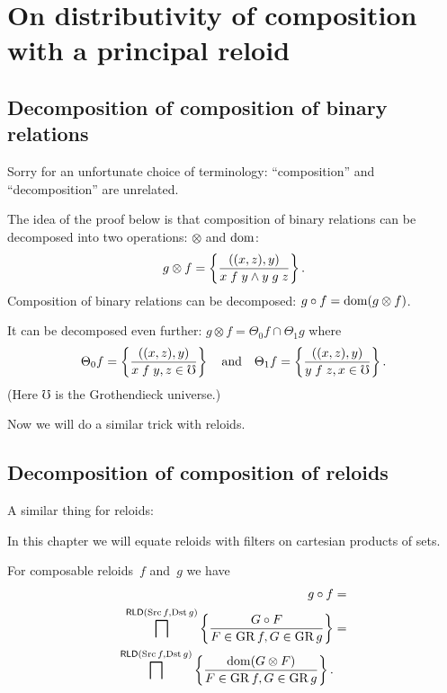 
\chapter{On distributivity of composition with a principal reloid}


\section{Decomposition of composition
of binary relations}
\begin{rem}
Sorry for an unfortunate choice of terminology: ``composition''
and ``decomposition'' are unrelated.
\end{rem}
The idea of the proof below is that composition of binary relations
can be decomposed into two operations: $\otimes$ and $\operatorname{dom}$:
\[
g\otimes f=\left\{ \frac{((x,z),y)}{x\mathrel fy\land y\mathrel gz}\right\}.
\]
Composition of binary relations can be decomposed: $g\circ f=\operatorname{dom}(g\otimes f)$.

It can be decomposed even further: $g\otimes f=\Theta_{0}f\cap\Theta_{1}g$
where
\[
\Theta_{0}f=\left\{ \frac{((x,z),y)}{x\mathrel fy,z\in\mho}\right\}\quad\text{and}\quad\Theta_{1}f=\left\{ \frac{((x,z),y)}{y\mathrel fz,x\in\mho}\right\}.
\]
(Here $\mho$ is the Grothendieck universe.)

Now we will do a similar trick with reloids.


\section{Decomposition of
composition of reloids}

A similar thing for reloids:

In this chapter we will equate reloids with filters on cartesian products
of sets.

For composable reloids~$f$ and~$g$ we have
\begin{align*}
g\circ f & =\\
\bigsqcap^{\mathsf{RLD}(\operatorname{Src} f,\operatorname{Dst} g)}\left\{ \frac{G\circ F}{F\in\operatorname{GR} f,G\in\operatorname{GR} g}\right\} & =\\
\bigsqcap^{\mathsf{RLD}(\operatorname{Src} f,\operatorname{Dst} g)}\left\{ \frac{\operatorname{dom}(G\otimes F)}{F\in\operatorname{GR} f,G\in\operatorname{GR} g}\right\}.
\end{align*}

